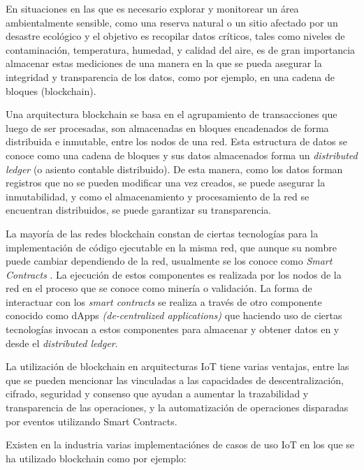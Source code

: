 En situaciones en las que es necesario explorar y monitorear un área ambientalmente sensible, como una reserva natural o un sitio afectado por un desastre ecológico y el objetivo es recopilar datos críticos, tales como niveles de contaminación, temperatura, humedad, y calidad del aire, es de gran importancia almacenar estas mediciones de una manera en la que se pueda asegurar la integridad y transparencia de los datos, como por ejemplo, en una cadena de bloques (blockchain).

Una arquitectura blockchain \cite{blockchain} se basa en el agrupamiento de transacciones que luego de ser procesadas, son almacenadas en bloques encadenados de forma distribuida e inmutable, entre los nodos de una red. Esta estructura de datos se conoce como una cadena de bloques y sus datos almacenados forma un \textit{distributed ledger} (o asiento contable distribuido). De esta manera, como los datos forman registros que no se pueden modificar una vez creados, se puede asegurar la inmutabilidad, y como el almacenamiento y procesamiento de la red se encuentran distribuidos, se puede garantizar su transparencia.

La mayoría de las redes blockchain constan de ciertas tecnologías para la implementación de código ejecutable en la misma red, que aunque su nombre puede cambiar dependiendo de la red, usualmente se los conoce como \textit{Smart Contracts} \citep{smart_contracts}. La ejecución de estos componentes es realizada por los nodos de la red en el proceso que se conoce como minería o validación. La forma de interactuar con los \textit{smart contracts} se realiza a través de otro componente conocido como dApps \textit{(de-centralized applications)} \citep{dapp} que haciendo uso de ciertas tecnologías invocan a estos componentes para almacenar y obtener datos en y desde el \textit{distributed ledger}.

La utilización de blockchain en arquitecturas IoT tiene varias ventajas, entre las que se pueden mencionar las vinculadas a las capacidades de descentralización, cifrado, seguridad y consenso que ayudan a aumentar la trazabilidad y transparencia de las operaciones, y la automatización de operaciones disparadas por eventos utilizando Smart Contracts.

Existen en la industria varias implementaciónes de casos de uso IoT en los que se ha utilizado blockchain como por ejemplo:

